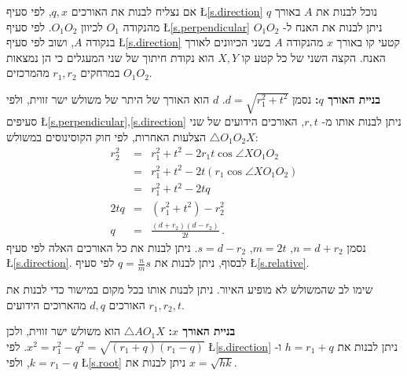 \documentclass[12pt,a4paper]{article}
\newcommand*{\disfrac}[2]{\displaystyle\frac{#1}{#2}}
\begin{document}
אם נצליח לבנות את האורכים
$q,x$,
לפי סעיף
\L{\ref{s.direction}}
נוכל לבנות את 
$A$
באורך
$q$
מהנקודה
$O_1$
לכיוון
$O_1O_2$.
לפי סעיף
\L{\ref{s.perpendicular}}
ניתן לבנות את האנח ל-%
$O_1O_2$
בנקודה
$A$,
ושוב לפי סעיף
\L{\ref{s.direction}}
קטעי קו באורך
$x$
מהנקודה
$A$
בשני הכיוונים לאורך האנח. הקצה השני של כל קטע קו
$X,Y$
הוא נקודת חיתוך של שני המעגלים כי הן נמצאות במרחקים 
$r_1,r_2$
מהמרכזים
$O_1O_2$.

\textbf{%
בניית האורך
$q$:}
נסמן
$d=\sqrt{r_1^2+t^2}$.
$d$
הוא האורך של היתר של משולש ישר זווית, ולפי סעיפים
\L{\ref{s.perpendicular},\ref{s.direction}}
ניתן לבנות אותו מ-%
$r,t$,
האורכים הידועים של שני הצלעות האחרות, לפי חוק הקוסינוסים במשולש
$\triangle O_1O_2X$:
\[
\renewcommand*{\arraystretch}{1.8}
\begin{array}{rcl}
r_2^2 &=& r_1^2 + t^2 - 2r_1t\cos\angle XO_1O_2\\
      &=& r_1^2 + t^2 - 2t(r_1\cos\angle XO_1O_2)\\
&=& r_1^2 + t^2 - 2tq\\
2tq &=& (r_1^2+t^2) - r_2^2\\
q&=&\disfrac{(d+r_2)(d-r_2)}{2t}\,.
\end{array}
\]
נסמן
$n= d+ r_2$, $m= 2t$, $s =d -r_2$.
ניתן לבנות את כל האורכים האלה לפי סעיף
\L{\ref{s.direction}}.
לבסוף, ניתן לבנות את
$q=\frac{n}{m}s$
לפי סעיף
\L{\ref{s.relative}}.

שימו לב שהמשולש לא מופיע האיור. ניתן לבנות אותו בכל מקום במישור כדי לבנות את האורכים
$d,q$
מהארוכים הידועים
$r_1,r_2,t$.

\textbf{%
בניית האורך
$x$:}
$\triangle AO_1X$
הוא משולש ישר זווית, ולכן
$x^2=r_1^2-q^2 =\sqrt{(r_1+q)(r_1-q)}$.
לפי
\L{\ref{s.direction}}
ניתן לבנות את
$h =r_1+ q$
ו-%
$k= r_1 - q$,
ולפי
\L{\ref{s.root}}
ניתן לבנות את
$x= \sqrt{hk}$. 
\end{document}
